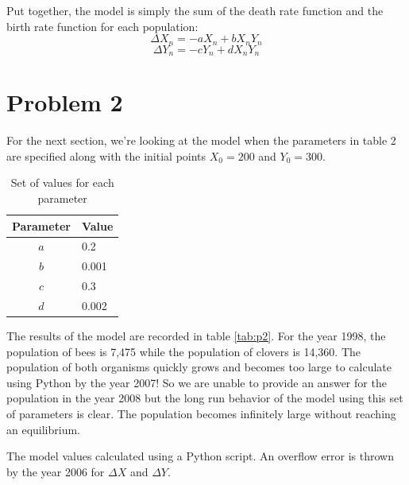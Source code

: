 \documentclass[12pt,a4paper,titlepage]{report}
\begin{document}
		Put together, the model is simply the sum of the death rate function and the birth rate function for each population: 
		\[\Delta X_{n} = -aX_{n} + b X_{n}Y_{n}\]
		\[\Delta Y_{n} = -cY_{n} + d X_{n}Y_{n}\]

	\section*{Problem 2}
		For the next section, we're looking at the model when the parameters in table 2 are specified along with the initial points \(X_{0} = 200\) and \(Y_{0} = 300\). 
		\begin{table}[ht]
			\centering
			\begin{tabular}{cl}
				\toprule
				Parameter & Value \\ 
				\midrule 
				\(a\) & 0.2\\ 
				\(b\) & 0.001 \\
				\(c\) & 0.3  \\ 
				\(d\) & 0.002  \\ 
				\bottomrule
			\end{tabular}
			\caption{Set of values for each parameter}
			\label{params1}
		\end{table}
		The results of the model are recorded in table \ref{tab:p2}. For the year 1998, the population of bees is 7,475 while the population of clovers is 14,360. The population of both organisms quickly grows and becomes too large to calculate using Python by the year 2007! So we are unable to provide an answer for the population in the year 2008 but the long run behavior of the model using this set of parameters is clear. The population becomes infinitely large without reaching an equilibrium. 
		\begin{table} 
			\centering
			
			\caption{The model values calculated using a Python script. An overflow error is thrown by the year 2006 for \(\Delta X\) and \(\Delta Y\).}
			\label{tab:p2}
		\end{table}
\end{document}
